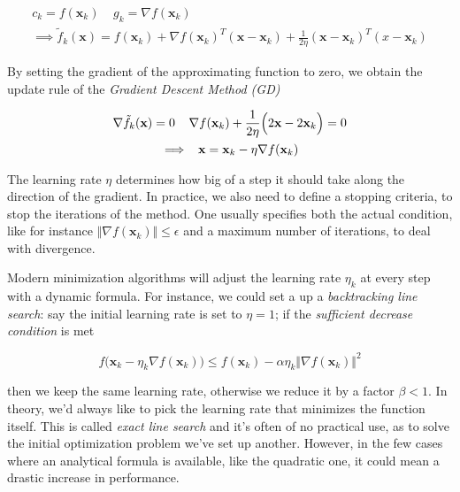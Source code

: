 \documentclass{article}
\numberwithin{equation}{subsection}
\begin{document}
\begin{gather*}
    c_k = f(\textbf{x}_k) \;\;\;\; g_k = \nabla f(\textbf{x}_k) \\ 
    \implies \tilde{f}_k(\textbf{x}) = f(\textbf{x}_k) + \nabla f(\textbf{x}_k)^T (\textbf{x} - \textbf{x}_k) + \frac{1}{2\eta} (\textbf{x}-\textbf{x}_k)^T (x - \textbf{x}_k)
\end{gather*}

By setting the gradient of the approximating function to zero, we obtain the update rule of the \textit{Gradient Descent Method (GD)}

\begin{gather}
    \nabla \tilde{f}_k(\textbf{x}) = 0 \;\;\;\; \nabla f(\textbf{x}_k) + \frac{1}{2\eta} \Big( 2\textbf{x} - 2 \textbf{x}_k \Big) = 0 \\ \notag
    \implies \;\; \textbf{x} = \textbf{x}_k - \eta \nabla f(\textbf{x}_k)
\end{gather}

The learning rate $\eta$ determines how big of a step it should take along the direction of the gradient. In practice, we also need to define a stopping criteria, to stop the iterations of the method. One usually specifies both the actual condition, like for instance $\Vert \nabla f(\textbf{x}_k) \Vert \leq \epsilon$ and a maximum number of iterations, to deal with divergence.

Modern minimization algorithms will adjust the learning rate $\eta_k$ at every step with a dynamic formula. For instance, we could set a up a \textit{backtracking line search}: say the initial learning rate is set to $\eta = 1$; if the \textit{sufficient decrease condition} is met

\begin{equation*}
    f\big(\textbf{x}_k - \eta_k \nabla f(\textbf{x}_k) \big) \leq f(\textbf{x}_k) - \alpha \eta_k \Vert \nabla f(\textbf{x}_k) \Vert^2
\end{equation*}

then we keep the same learning rate, otherwise we reduce it by a factor $\beta < 1$. In theory, we'd always like to pick the learning rate that minimizes the function itself. This is called \textit{exact line search} and it's often of no practical use, as to solve the initial optimization problem we've set up another. However, in the few cases where an analytical formula is available, like the quadratic one, it could mean a drastic increase in performance. 
\end{document}
